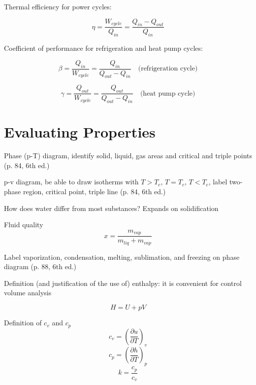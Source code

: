 \documentclass[paper=letter, fontsize=11pt]{scrartcl}
\numberwithin{equation}{section}        %
\numberwithin{figure}{section}          %
\numberwithin{table}{section}               %
\begin{document}
Thermal efficiency for power cycles:

\begin{equation}
\eta = \frac{W_{cycle}}{Q_{in}} = \frac{Q_{in}-Q_{out}}{Q_{in}}
\end{equation}

Coefficient of performance for refrigeration and heat pump cycles:

\begin{equation}
\beta = \frac{Q_{in}}{W_{cycle}} = \frac{Q_{in}}{Q_{out}-Q_{in}}\quad\text{(refrigeration cycle)}
\end{equation}

\begin{equation}
\gamma = \frac{Q_{out}}{W_{cycle}} = \frac{Q_{out}}{Q_{out}-Q_{in}}\quad\text{(heat pump cycle)}
\end{equation}


\section{Evaluating Properties}

Phase (p-T) diagram, identify solid, liquid, gas areas and critical and triple points (p. 84, 6th ed.)

p-v diagram, be able to draw isotherms with $T>T_c$, $T=T_c$, $T<T_c$, label two-phase region, critical point, triple line (p. 84, 6th ed.)

How does water differ from most substances? Expands on solidification

Fluid quality 
\begin{equation}
    x = \frac{m_{vap}}{m_{liq}+m_{vap}}
\end{equation}

Label vaporization, condensation, melting, sublimation, and freezing on phase diagram (p. 88, 6th ed.)

Definition (and justification of the use of) enthalpy: it is convenient for control volume analysis

\begin{equation}
    H=U+pV
\end{equation}

Definition of $c_v$ and $c_p$ 
\begin{equation}
    c_v = \left(\frac{\partial u}{\partial T}\right)_v
\end{equation}
\begin{equation}
    c_p = \left(\frac{\partial h}{\partial T}\right)_p
\end{equation}
\begin{equation}
    k = \frac{c_p}{c_v}
\end{equation}
\end{document}
